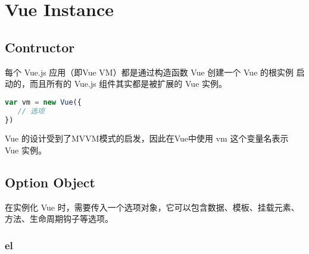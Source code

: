 \begin{lstlisting}[language=JavaScript]

\end{lstlisting}





\begin{lstlisting}[language=JavaScript]

\end{lstlisting}




\begin{lstlisting}[language=JavaScript]

\end{lstlisting}





\begin{lstlisting}[language=JavaScript]

\end{lstlisting}


\chapter{Vue Instance}

\section{Contructor}

每个 Vue.js 应用（即Vue VM）都是通过构造函数 Vue 创建一个 Vue 的根实例 启动的，而且所有的 Vue.js 组件其实都是被扩展的 Vue 实例。


\begin{lstlisting}[language=JavaScript]
var vm = new Vue({
   // 选项
})
\end{lstlisting}


 Vue 的设计受到了MVVM模式的启发，因此在Vue中使用 vm 这个变量名表示 Vue 实例。
 
 

 
 \section{Option Object}


在实例化 Vue 时，需要传入一个选项对象，它可以包含数据、模板、挂载元素、方法、生命周期钩子等选项。

\subsection{el}


